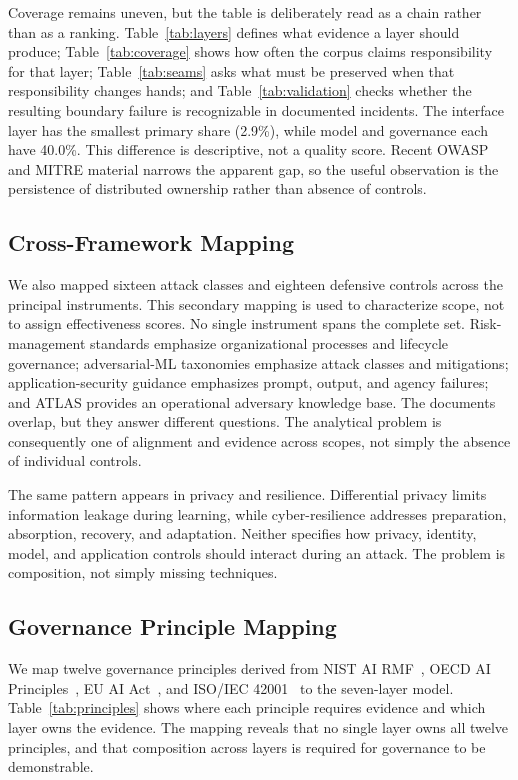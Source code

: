 \documentclass[runningheads]{llncs}
\begin{document}
Coverage remains uneven, but the table is deliberately read as a chain rather than as a ranking. Table~\ref{tab:layers} defines what evidence a layer should produce; Table~\ref{tab:coverage} shows how often the corpus claims responsibility for that layer; Table~\ref{tab:seams} asks what must be preserved when that responsibility changes hands; and Table~\ref{tab:validation} checks whether the resulting boundary failure is recognizable in documented incidents. The interface layer has the smallest primary share (2.9\%), while model and governance each have 40.0\%. This difference is descriptive, not a quality score. Recent OWASP and MITRE material narrows the apparent gap, so the useful observation is the persistence of distributed ownership rather than absence of controls.

\subsection{Cross-Framework Mapping}
\label{sec:cross}

We also mapped sixteen attack classes and eighteen defensive controls across the principal instruments. This secondary mapping is used to characterize scope, not to assign effectiveness scores. No single instrument spans the complete set. Risk-management standards emphasize organizational processes and lifecycle governance; adversarial-ML taxonomies emphasize attack classes and mitigations; application-security guidance emphasizes prompt, output, and agency failures; and ATLAS provides an operational adversary knowledge base. The documents overlap, but they answer different questions. The analytical problem is consequently one of alignment and evidence across scopes, not simply the absence of individual controls.

The same pattern appears in privacy and resilience. Differential privacy limits information leakage during learning, while cyber-resilience addresses preparation, absorption, recovery, and adaptation. Neither specifies how privacy, identity, model, and application controls should interact during an attack. The problem is composition, not simply missing techniques.

\subsection{Governance Principle Mapping}
\label{sec:principles}

We map twelve governance principles derived from NIST AI RMF~\cite{nistrmf2023,nistgaiprofile2024}, OECD AI Principles~\cite{oecd2024principles}, EU AI Act~\cite{euaiact2024}, and ISO/IEC 42001~\cite{iso42001} to the seven-layer model. Table~\ref{tab:principles} shows where each principle requires evidence and which layer owns the evidence. The mapping reveals that no single layer owns all twelve principles, and that composition across layers is required for governance to be demonstrable.
\end{document}
